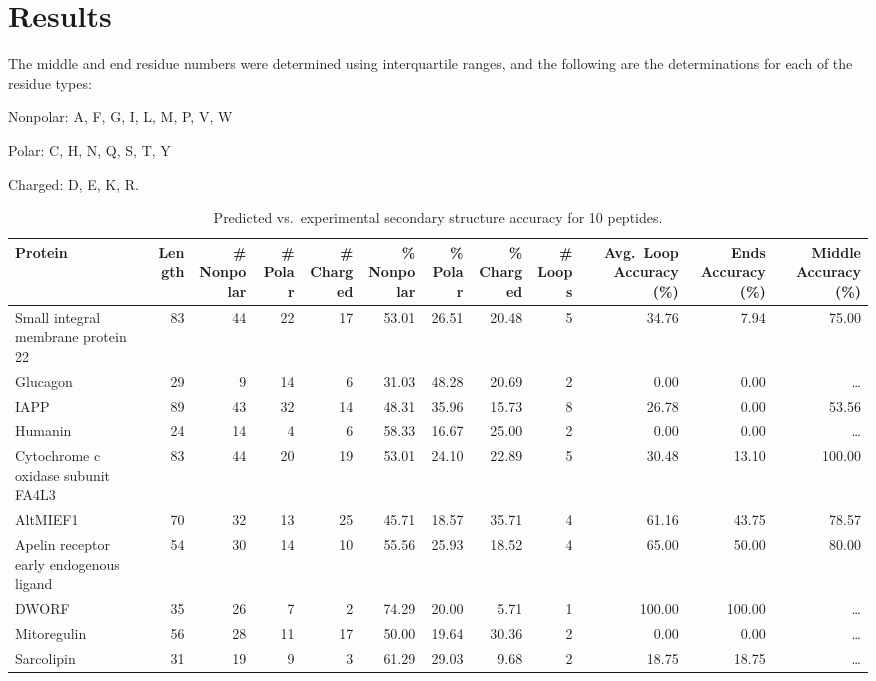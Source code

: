 \documentclass[aps,prl,reprint]{revtex4-2}
\begin{document}
\section{Results}
The middle and end residue numbers were determined using interquartile ranges, and the following are the determinations for each of the residue types:

Nonpolar: A, F, G, I, L, M, P, V, W

Polar: C, H, N, Q, S, T, Y

Charged: D, E, K, R.

\begin{table}[htbp]
\centering
\caption{Predicted vs.\ experimental secondary structure accuracy for 10 peptides.}
\label{tab:protein_accuracy}
\renewcommand{\arraystretch}{1.2}
\begin{tabularx}{\textwidth}{X N N N N N N N N N N N}
\toprule
Protein & Length & \# Nonpolar & \# Polar & \# Charged & \% Nonpolar & \% Polar & \% Charged & \# Loops & Avg.\ Loop Accuracy (\%) & Ends Accuracy (\%) & Middle Accuracy (\%) \\
\midrule
Small integral membrane protein 22       & 83 & 44 & 22 & 17 & 53.01 & 26.51 & 20.48 & 5 & 34.76 &  7.94 & 75.00 \\
Glucagon                                 & 29 &  9 & 14 &  6 & 31.03 & 48.28 & 20.69 & 2 &  0.00 &  0.00 & \ldots \\
IAPP                                     & 89 & 43 & 32 & 14 & 48.31 & 35.96 & 15.73 & 8 & 26.78 &  0.00 & 53.56 \\
Humanin                                  & 24 & 14 &  4 &  6 & 58.33 & 16.67 & 25.00 & 2 &  0.00 &  0.00 & \ldots \\
Cytochrome c oxidase subunit FA4L3       & 83 & 44 & 20 & 19 & 53.01 & 24.10 & 22.89 & 5 & 30.48 & 13.10 & 100.00 \\
AltMIEF1                                 & 70 & 32 & 13 & 25 & 45.71 & 18.57 & 35.71 & 4 & 61.16 & 43.75 & 78.57 \\
Apelin receptor early endogenous ligand  & 54 & 30 & 14 & 10 & 55.56 & 25.93 & 18.52 & 4 & 65.00 & 50.00 & 80.00 \\
DWORF                                    & 35 & 26 &  7 &  2 & 74.29 & 20.00 &  5.71 & 1 & 100.00 & 100.00 & \ldots \\
Mitoregulin                              & 56 & 28 & 11 & 17 & 50.00 & 19.64 & 30.36 & 2 &  0.00 &  0.00 & \ldots \\
Sarcolipin                               & 31 & 19 &  9 &  3 & 61.29 & 29.03 &  9.68 & 2 & 18.75 & 18.75 & \ldots \\
\bottomrule
\end{tabularx}
\end{table}
\end{document}
